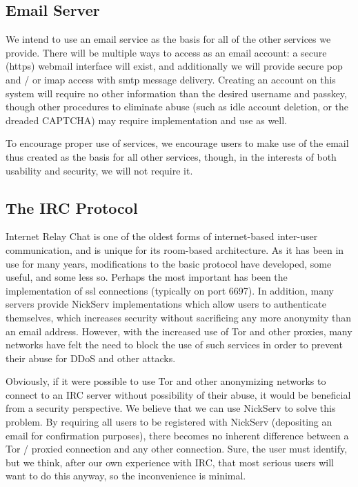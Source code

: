 \documentclass[11pt]{article}
\begin{document}
\subsection{Email Server}

We intend to use an email service as the basis for all of the other services
we provide.  There will be multiple ways to access as an email account: a
secure (https) webmail interface will exist, and additionally we will provide
secure pop and / or imap access with smtp message delivery.  Creating an
account on this system will require no other information than the desired
username and passkey, though other procedures to eliminate abuse (such as
idle account deletion, or the dreaded CAPTCHA) may require implementation and
use as well.

To encourage proper use of services, we encourage users to make use of the
email thus created as the basis for all other services, though, in the
interests of both usability and security, we will not require it.

\subsection{The IRC Protocol}

Internet Relay Chat is one of the oldest forms of internet-based inter-user
communication, and is unique for its room-based architecture.  As it has been
in use for many years, modifications to the basic protocol have developed,
some useful, and some less so.  Perhaps the most important has been the
implementation of ssl connections (typically on port 6697).  In addition, many
servers provide NickServ implementations which allow users to authenticate
themselves, which increases security without sacrificing any more anonymity
than an email address.  However, with the increased use of Tor and other
proxies, many networks have felt the need to block the use of such services in
order to prevent their abuse for DDoS and other attacks.

Obviously, if it were possible to use Tor and other anonymizing networks to
connect to an IRC server without possibility of their abuse, it would be
beneficial from a security perspective.  We believe that we can use NickServ
to solve this problem.  By requiring all users to be registered with NickServ
(depositing an email for confirmation purposes), there becomes no inherent
difference between a Tor / proxied connection and any other connection.  Sure,
the user must identify, but we think, after our own experience with IRC, that
most serious users will want to do this anyway, so the inconvenience is
minimal.
\end{document}
